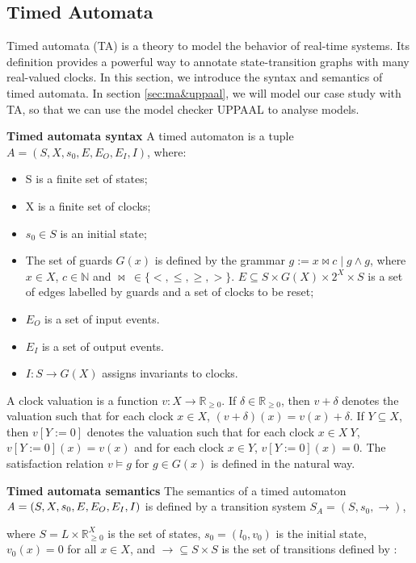 \subsection{Timed Automata}
Timed automata (TA) \cite{BehrmannDLHPYH06} is a theory to model the behavior of real-time systems. Its definition provides a powerful way to annotate state-transition graphs with many real-valued clocks. In this section, we introduce the syntax and semantics of timed automata. In section \ref{sec:ma&uppaal}, we will model our case study with TA, so that we can use the model checker UPPAAL to analyse models.
\begin{definition}
\textbf{Timed automata syntax}
A timed automaton is a tuple $\textit{A}=(S,X,s_{0},E,E_{O},E_{I},I)$, where:
\end{definition}
\begin{itemize}
\item
S is a finite set of states;
\item
X is a finite set of clocks;
\item
$s_{0}\in  S$ is an initial state;
\item
The set of guards $G(x)$ is defined by the grammar $g := x \bowtie c \mid g \land g$, where $x \in X$, $c \in \mathbb{N}$ and $\bowtie~\in \{<,\leqslant,\geqslant,>\}$. $E\subseteq S \times G(X) \times 2^X \times S$ is a set of edges labelled by guards and a set of clocks to be reset;
\item
$E_{O}$ is a set of input events.
\item
$E_{I}$ is a set of output events.
\item
$I : S \rightarrow G(X)$ assigns invariants to clocks.
\end{itemize}
A clock valuation is a function $v : X \rightarrow \mathbb{R}_{\geqslant{0}}$. If $\delta \in \mathbb{R}_{\geqslant{0}}$, then $v + \delta$ denotes the valuation such that for each clock $x \in X$, $(v + \delta)(x) = v(x) + \delta$. If $Y \subseteq X$, then $v[Y := 0]$ denotes the valuation such that for each clock $x \in X~Y$, $v[Y := 0 ](x) = v(x)$ and for each clock $x \in Y$, $v[Y := 0](x) = 0$. The satisfaction relation $v \models g$ for $g \in G(x)$ is defined in the natural way.
\begin{definition}
\textbf{Timed automata semantics} 
The semantics of a timed automaton $\textit{A} = (S,X,s_{0},E, \\E_{O},E_{I},I)$ is defined by a transition system $S_{\textit{A}} = (S,s_{0},\rightarrow)$, \end{definition}
where $S = L \times \mathbb{R}_{\geqslant{0}}^X$ is the set of states, $s_{0} = (l_{0},v_{0})$ is the initial state, $v_{0}(x) = 0$ for all $x \in X$, and $\rightarrow \subseteq S \times S$ is the set of transitions defined by :
